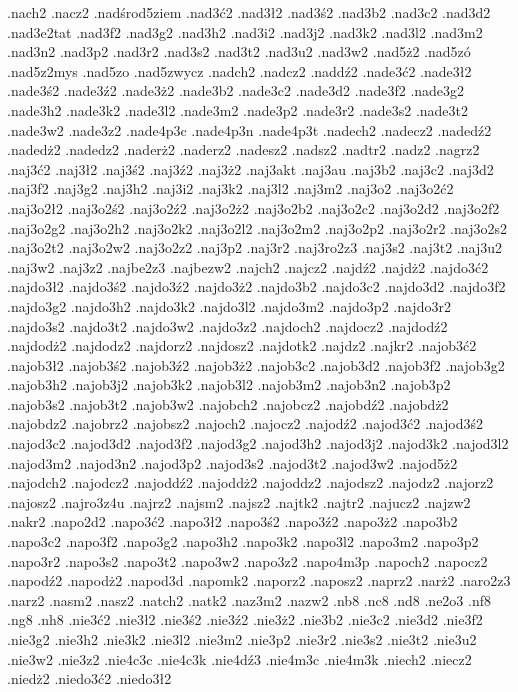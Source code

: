 {.nach2
.nacz2
.nadśrod5ziem
.nad3ć2
.nad3ł2
.nad3ś2
.nad3b2
.nad3c2
.nad3d2
.nad3e2tat
.nad3f2
.nad3g2
.nad3h2
.nad3i2
.nad3j2
.nad3k2
.nad3l2
.nad3m2
.nad3n2
.nad3p2
.nad3r2
.nad3s2
.nad3t2
.nad3u2
.nad3w2
.nad5ż2
.nad5zó
.nad5z2mys
.nad5zo
.nad5zwycz
.nadch2
.nadcz2
.naddź2
.nade3ć2
.nade3ł2
.nade3ś2
.nade3ź2
.nade3ż2
.nade3b2
.nade3c2
.nade3d2
.nade3f2
.nade3g2
.nade3h2
.nade3k2
.nade3l2
.nade3m2
.nade3p2
.nade3r2
.nade3s2
.nade3t2
.nade3w2
.nade3z2
.nade4p3c
.nade4p3n
.nade4p3t
.nadech2
.nadecz2
.nadedź2
.nadedż2
.nadedz2
.naderż2
.naderz2
.nadesz2
.nadsz2
.nadtr2
.nadz2
.nagrz2
.naj3ć2
.naj3ł2
.naj3ś2
.naj3ź2
.naj3ż2
.naj3akt
.naj3au
.naj3b2
.naj3c2
.naj3d2
.naj3f2
.naj3g2
.naj3h2
.naj3i2
.naj3k2
.naj3l2
.naj3m2
.naj3o2
.naj3o2ć2
.naj3o2ł2
.naj3o2ś2
.naj3o2ź2
.naj3o2ż2
.naj3o2b2
.naj3o2c2
.naj3o2d2
.naj3o2f2
.naj3o2g2
.naj3o2h2
.naj3o2k2
.naj3o2l2
.naj3o2m2
.naj3o2p2
.naj3o2r2
.naj3o2s2
.naj3o2t2
.naj3o2w2
.naj3o2z2
.naj3p2
.naj3r2
.naj3ro2z3
.naj3s2
.naj3t2
.naj3u2
.naj3w2
.naj3z2
.najbe2z3
.najbezw2
.najch2
.najcz2
.najdź2
.najdż2
.najdo3ć2
.najdo3ł2
.najdo3ś2
.najdo3ź2
.najdo3ż2
.najdo3b2
.najdo3c2
.najdo3d2
.najdo3f2
.najdo3g2
.najdo3h2
.najdo3k2
.najdo3l2
.najdo3m2
.najdo3p2
.najdo3r2
.najdo3s2
.najdo3t2
.najdo3w2
.najdo3z2
.najdoch2
.najdocz2
.najdodź2
.najdodż2
.najdodz2
.najdorz2
.najdosz2
.najdotk2
.najdz2
.najkr2
.najob3ć2
.najob3ł2
.najob3ś2
.najob3ź2
.najob3ż2
.najob3c2
.najob3d2
.najob3f2
.najob3g2
.najob3h2
.najob3j2
.najob3k2
.najob3l2
.najob3m2
.najob3n2
.najob3p2
.najob3s2
.najob3t2
.najob3w2
.najobch2
.najobcz2
.najobdź2
.najobdż2
.najobdz2
.najobrz2
.najobsz2
.najoch2
.najocz2
.najodź2
.najod3ć2
.najod3ś2
.najod3c2
.najod3d2
.najod3f2
.najod3g2
.najod3h2
.najod3j2
.najod3k2
.najod3l2
.najod3m2
.najod3n2
.najod3p2
.najod3s2
.najod3t2
.najod3w2
.najod5ż2
.najodch2
.najodcz2
.najoddź2
.najoddż2
.najoddz2
.najodsz2
.najodz2
.najorz2
.najosz2
.najro3z4u
.najrz2
.najsm2
.najsz2
.najtk2
.najtr2
.najucz2
.najzw2
.nakr2
.napo2d2
.napo3ć2
.napo3ł2
.napo3ś2
.napo3ź2
.napo3ż2
.napo3b2
.napo3c2
.napo3f2
.napo3g2
.napo3h2
.napo3k2
.napo3l2
.napo3m2
.napo3p2
.napo3r2
.napo3s2
.napo3t2
.napo3w2
.napo3z2
.napo4m3p
.napoch2
.napocz2
.napodź2
.napodż2
.napod3d
.napomk2
.naporz2
.naposz2
.naprz2
.narż2
.naro2z3
.narz2
.nasm2
.nasz2
.natch2
.natk2
.naz3m2
.nazw2
.nb8
.nc8
.nd8
.ne2o3
.nf8
.ng8
.nh8
.nie3ć2
.nie3ł2
.nie3ś2
.nie3ź2
.nie3ż2
.nie3b2
.nie3c2
.nie3d2
.nie3f2
.nie3g2
.nie3h2
.nie3k2
.nie3l2
.nie3m2
.nie3p2
.nie3r2
.nie3s2
.nie3t2
.nie3u2
.nie3w2
.nie3z2
.nie4c3c
.nie4c3k
.nie4dź3
.nie4m3c
.nie4m3k
.niech2
.niecz2
.niedż2
.niedo3ć2
.niedo3ł2
}
